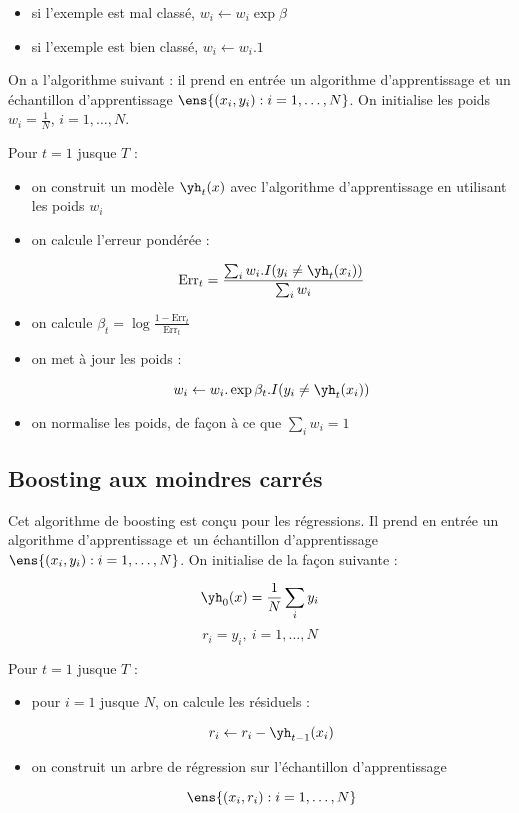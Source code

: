 	\begin{itemize}
		\item si l'exemple est mal classé, $w_i \leftarrow w_i \exp{\beta}$
		\item si l'exemple est bien classé, $w_i \leftarrow w_i . 1$
	\end{itemize}
	
	On a l'algorithme suivant : il prend en entrée un algorithme d'apprentissage et un échantillon d'apprentissage $\ens{(x_i, y_i) : i = 1, \dots , N}$. On initialise les poids $w_i = \frac{1}{N}$, $i = 1 , \dots , N$.
	
	Pour $t = 1$ jusque $T$ :
	
	\begin{itemize}
		\item on construit un modèle $\yh_t(x)$ avec l'algorithme d'apprentissage en utilisant les poids $w_i$
		\item on calcule l'erreur pondérée :
		
		$$\text{Err}_t = \frac{\sum_i w_i . I(y_i \neq \yh_t(x_i))}{\sum_i w_i}$$
		
		\item on calcule $\beta_t = \log{\frac{1 - \text{Err}_t}{\text{Err}_t}}$
		\item on met à jour les poids :
		
		$$w_i \leftarrow w_i . \exp{\beta_t . I(y_i \neq \yh_t(x_i))}$$
		
		\item on normalise les poids, de façon à ce que $\sum_i w_i = 1$
	\end{itemize}
	
		
	\subsection{Boosting aux moindres carrés}
	
	Cet algorithme de boosting est conçu pour les régressions. Il prend en entrée un algorithme d'apprentissage et un échantillon d'apprentissage $\ens{(x_i, y_i) : i = 1, \dots , N}$. On initialise de la façon suivante :
	
	$$\yh_0(x) = \frac{1}{N} \sum_i y_i$$
	$$r_i = y_i, \: i = 1, \dots , N$$
	
	Pour $t = 1$ jusque $T$ :
	
	\begin{itemize}
		\item pour $i = 1$ jusque $N$, on calcule les résiduels :
		
		$$r_i \leftarrow r_i - \yh_{t - 1}(x_i)$$
		
		\item on construit un arbre de régression sur l'échantillon d'apprentissage
		
		$$\ens{(x_i, r_i) : i = 1, \dots , N}$$
	\end{itemize}
	
